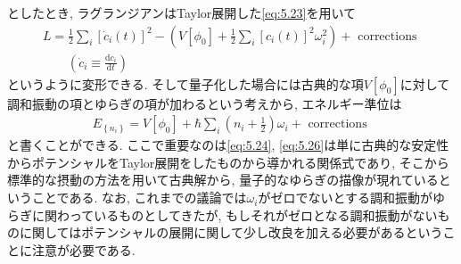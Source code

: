 \documentclass[dvipdfmx,11pt,a4paper,oneside,openany]{jsbook}
\begin{document}
としたとき, ラグランジアンはTaylor展開した\eqref{eq:5.23}を用いて
\begin{align}
    L=\frac{1}{2} \sum_{i}\left[\dot{c}_{i}(t)\right]^{2}-\left(V\left[\phi_{0}\right]+\frac{1}{2} \sum_{i}\left[c_{i}(t)\right]^{2} \omega_{i}^{2}\right)+\text { corrections }\label{eq:5.26} \\
    \qquad \left(\dot{c}_i\equiv \frac{\mathrm{d}c_i}{\mathrm{d}t}\right) \nonumber
\end{align}
というように変形できる. そして量子化した場合には古典的な項$V[\phi_0]$に対して調和振動の項とゆらぎの項が加わるという考えから, エネルギー準位は
\begin{align}
    E_{\left\{n_{i}\right\}}=V\left[\phi_{0}\right]+\hbar \sum_{i}\left(n_{i}+\frac{1}{2}\right) \omega_{i}+\text { corrections }\label{eq:5.27}
\end{align}
と書くことができる. ここで重要なのは\eqref{eq:5.24}, \eqref{eq:5.26}は単に古典的な安定性からポテンシャルをTaylor展開をしたものから導かれる関係式であり, そこから標準的な摂動の方法を用いて古典解から, 量子的なゆらぎの描像が現れているということである. なお, これまでの議論では$\omega_i$がゼロでないとする調和振動がゆらぎに関わっているものとしてきたが, もしそれがゼロとなる調和振動がないものに関してはポテンシャルの展開に関して少し改良を加える必要があるということに注意が必要である.
\end{document}
